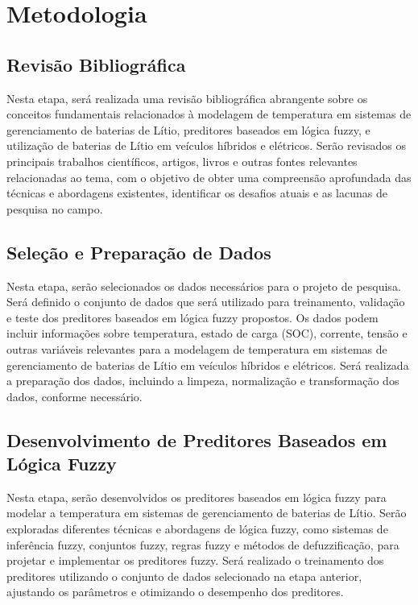 \section{Metodologia}
\subsection{Revisão Bibliográfica}
Nesta etapa, será realizada uma revisão bibliográfica abrangente sobre os conceitos fundamentais relacionados à modelagem de temperatura em sistemas de gerenciamento de baterias de Lítio, preditores baseados em lógica fuzzy, e utilização de baterias de Lítio em veículos híbridos e elétricos. Serão revisados os principais trabalhos científicos, artigos, livros e outras fontes relevantes relacionadas ao tema, com o objetivo de obter uma compreensão aprofundada das técnicas e abordagens existentes, identificar os desafios atuais e as lacunas de pesquisa no campo.

\subsection{Seleção e Preparação de Dados}
Nesta etapa, serão selecionados os dados necessários para o projeto de pesquisa. Será definido o conjunto de dados que será utilizado para treinamento, validação e teste dos preditores baseados em lógica fuzzy propostos. Os dados podem incluir informações sobre temperatura, estado de carga (SOC), corrente, tensão e outras variáveis relevantes para a modelagem de temperatura em sistemas de gerenciamento de baterias de Lítio em veículos híbridos e elétricos. Será realizada a preparação dos dados, incluindo a limpeza, normalização e transformação dos dados, conforme necessário.

\subsection{Desenvolvimento de Preditores Baseados em Lógica Fuzzy}
Nesta etapa, serão desenvolvidos os preditores baseados em lógica fuzzy para modelar a temperatura em sistemas de gerenciamento de baterias de Lítio. Serão exploradas diferentes técnicas e abordagens de lógica fuzzy, como sistemas de inferência fuzzy, conjuntos fuzzy, regras fuzzy e métodos de defuzzificação, para projetar e implementar os preditores fuzzy. Será realizado o treinamento dos preditores utilizando o conjunto de dados selecionado na etapa anterior, ajustando os parâmetros e otimizando o desempenho dos preditores.

